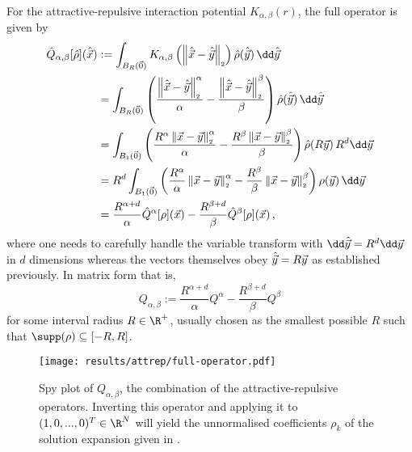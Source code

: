 For the attractive-repulsive interaction potential $K_{\alpha,\beta}(r)$, the full operator is given by
\begin{align*}
  \hat{Q}_{\alpha, \beta}[\hat{\rho}](\hatvec{x}) & := \int_{B_R(\vec{0})} K_{\alpha,\beta}\left(\norm{\hatvec{x} - \hatvec{y}}\right) \hat{\rho}(\hatvec{y}) \,\dd\hatvec{y}                                                               \\
                                                  & = \int_{B_R(\vec{0})} \left(\frac{\norm{\hatvec{x} - \hatvec{y}}^\alpha}{\alpha} - \frac{\norm{\hatvec{x} - \hatvec{y}}^\beta}{\beta}\right) \hat{\rho}(\hatvec{y}) \,\dd\hatvec{y}     \\
                                                  & = \int_{B_1(\vec{0})} \left(\frac{R^\alpha \norm{\vec{x} - \vec{y}}^\alpha}{\alpha} - \frac{R^\beta \norm{\vec{x} - \vec{y}}^\beta}{\beta}\right) \hat{\rho}(R\vec{y}) \, R^d\dd\vec{y} \\
                                                  & = R^d\int_{B_1(\vec{0})} \left(\frac{R^\alpha}{\alpha}\norm{\vec{x} - \vec{y}}^\alpha - \frac{R^\beta}{\beta} \norm{\vec{x} - \vec{y}}^\beta\right) \rho(\vec{y}) \,\dd\vec{y}          \\
                                                  & = \frac{R^{\alpha+d}}{\alpha} \hat{Q}^\alpha[\rho](\vec{x}) - \frac{R^{\beta+d}}{\beta} \hat{Q}^\beta[\rho](\vec{x})\,,
\end{align*}
where one needs to carefully handle the variable transform with $\dd\hatvec{y} = R^d \dd\vec{y}$ in $d$ dimensions whereas the vectors themselves obey $\hat{\vec{y}} = R \vec{y}$ as established previously.
In matrix form that is,
\begin{equation}
  Q_{\alpha, \beta} := \frac{R^{\alpha+d}}{\alpha} Q^\alpha - \frac{R^{\beta+d}}{\beta} Q^\beta
  \label{eq:full-attrep-operator}
\end{equation}
for some interval radius $R \in \R^+$, usually chosen as the smallest possible $R$ such that $\supp(\rho) \subseteq [-R, R]$.

\begin{figure}[H]
  \centering
  \texttt{[image: results/attrep/full-operator.pdf]}
  \caption[Combination of the attractive-repulsive operators]{Spy plot of $Q_{\alpha, \beta}$, the combination of the attractive-repulsive operators. Inverting this operator and applying it to $(1, 0, ..., 0)^T \in \R^N$ will yield the unnormalised coefficients $\rho_k$ of the solution expansion given in .}
  \label{fig:attrep-operator}
\end{figure}

